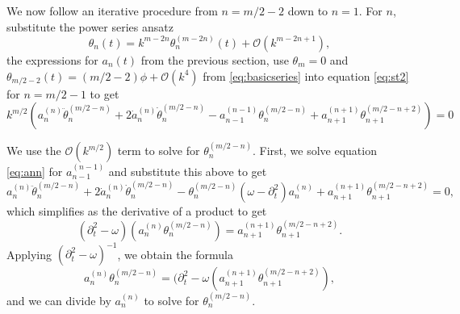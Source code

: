 \documentclass[11pt,reqno]{amsart}
\begin{document}
We now follow an iterative procedure from $n=m/2-2$ down to $n=1$. For $n$, substitute the power series ansatz
\[
\theta_{n}(t) = k^{m-2n} \theta_{n}^{(m-2n)}(t) + \mathcal{O}(k^{m-2n+1}),
\]
the expressions for $a_n(t)$ from the previous section, use $\theta_m = 0$ and
$\theta_{m/2-2}(t) = (m/2-2)\phi + \mathcal{O}(k^4)$ from \cref{eq:basicseries} into equation \cref{eq:st2} for $n=m/2-1$ to get
\[
k^{m/2} \left( a_n^{(n)} \ddot\theta_n^{(m/2-n)} + 2 \dot a_n^{(n)} \dot \theta_n^{(m/2-n)}
- a_{n-1}^{(n-1)} \theta_n^{(m/2-n)} + a_{n+1}^{(n+1)} \theta_{n+1}^{(m/2-n+2)} \right) = 0
\]

We use the $\mathcal{O}(k^{m/2})$ term to solve for $\theta_{n}^{(m/2-n)}$. First, we solve equation \cref{eq:ann} for $a_{n-1}^{(n-1)}$ and substitute this above to get
\[
a_n^{(n)} \ddot\theta_n^{(m/2-n)} + 2 \dot a_n^{(n)} \dot \theta_n^{(m/2-n)}
- \theta_n^{(m/2-n)} (\omega - \partial_t^2) a_n^{(n)} + a_{n+1}^{(n+1)} \theta_{n+1}^{(m/2-n+2)} = 0,
\]
which simplifies as the derivative of a product to get
\[
(\partial_t^2 - \omega)\left( a_n^{(n)} \theta_n^{(m/2-n)} \right) = a_{n+1}^{(n+1)} \theta_{n+1}^{(m/2-n+2)}.
\]
Applying $(\partial_t^2 - \omega)^{-1}$, we obtain the formula
\begin{equation}\label{an2th}
a_n^{(n)} \theta_n^{(m/2-n)} = (\partial_t^2 - \omega \left( a_{n+1}^{(n+1)} \theta_{n+1}^{(m/2-n+2)} \right),
\end{equation}
and we can divide by $a_n^{(n)}$ to solve for $\theta_n^{(m/2-n)}$. 
\end{document}
